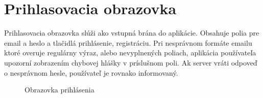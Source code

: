 \section{Prihlasovacia obrazovka}

Prihlasovacia obrazovka slúži ako vstupná brána do aplikácie. Obsahuje polia pre email a heslo a tlačidlá prihlásenie, registráciu. Pri nesprávnom formáte emailu ktoré overuje regulárny výraz, alebo nevyplnených poliach, aplikácia používateľa upozorní zobrazením chybovej hlášky v príslušnom poli. Ak server vráti odpoveď o nesprávnom hesle,  používateľ je rovnako informovaný.

\vspace{10pt}


\begin{figure}[H]
    \begin{center}
        \begin{minipage}{0.7\linewidth}
            \begin{center}
                \caption{Obrazovka prihlásenia}
                \label{obr3.3}
            \end{center}
        \end{minipage}
    \end{center}
\end{figure}




